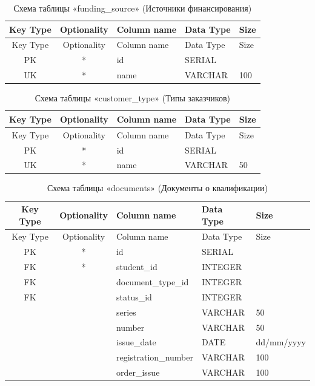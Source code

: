 \begin{xltabular}{\textwidth}{|c|c|l|l|X|}
	\caption{Схема таблицы «funding\_source» (Источники финансирования)\label{tab:funding_source}}\\ \hline
	\centrow Key Type & \centrow Optionality & \centrow Column name & \centrow Data Type & \centrow Size \\ \hline
	\endfirsthead
	\centrow Key Type & \centrow Optionality & \centrow Column name & \centrow Data Type & \centrow Size \\ \hline
	\finishhead
	PK & * & id & SERIAL & \\ \hline
	UK & * & name & VARCHAR & 100 \\ \hline
\end{xltabular}

\begin{xltabular}{\textwidth}{|c|c|l|l|X|}
	\caption{Схема таблицы «customer\_type» (Типы заказчиков)\label{tab:customer_type}}\\ \hline
	\centrow Key Type & \centrow Optionality & \centrow Column name & \centrow Data Type & \centrow Size \\ \hline
	\endfirsthead
	\centrow Key Type & \centrow Optionality & \centrow Column name & \centrow Data Type & \centrow Size \\ \hline
	\finishhead
	PK & * & id & SERIAL & \\ \hline
	UK & * & name & VARCHAR & 50 \\ \hline
\end{xltabular}

\begin{xltabular}{\textwidth}{|c|c|l|l|X|}
	\caption{Схема таблицы «documents» (Документы о квалификации)\label{tab:documents}}\\ \hline
	\centrow Key Type & \centrow Optionality & \centrow Column name & \centrow Data Type & \centrow Size \\ \hline
	\endfirsthead
	\centrow Key Type & \centrow Optionality & \centrow Column name & \centrow Data Type & \centrow Size \\ \hline
	\finishhead
	PK & * & id & SERIAL & \\ \hline
	FK & * & student\_id & INTEGER & \\ \hline
	FK & & document\_type\_id & INTEGER & \\ \hline
	FK & & status\_id & INTEGER & \\ \hline
	& & series & VARCHAR & 50 \\ \hline
	& & number & VARCHAR & 50 \\ \hline
	& & issue\_date & DATE & dd/mm/yyyy \\ \hline
	& & registration\_number & VARCHAR & 100 \\ \hline
	& & order\_issue & VARCHAR & 100 \\ \hline
\end{xltabular}

